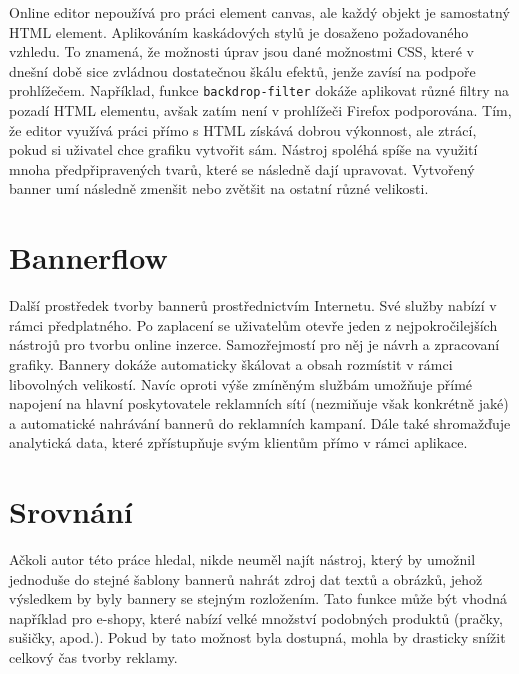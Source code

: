 Online editor nepoužívá pro práci element canvas, ale každý objekt je samostatný HTML element. Aplikováním kaskádových stylů je dosaženo požadovaného vzhledu.
To znamená, že možnosti úprav jsou dané možnostmi CSS, které v dnešní době sice zvládnou dostatečnou škálu efektů, jenže zavísí na podpoře prohlížečem.
Například, funkce \texttt{backdrop-filter} dokáže aplikovat různé filtry na pozadí HTML elementu, avšak zatím není v prohlížeči Firefox podporována.
Tím, že editor využívá práci přímo s HTML získává dobrou výkonnost, ale ztrácí, pokud si uživatel chce grafiku vytvořit sám.
Nástroj spoléhá spíše na využití mnoha předpřipravených tvarů, které se následně dají upravovat. Vytvořený banner umí následně zmenšit nebo
zvětšit na ostatní různé velikosti.

\section{Bannerflow}
Další prostředek tvorby bannerů prostřednictvím Internetu. Své služby nabízí v rámci předplatného.
Po zaplacení se uživatelům otevře jeden z nejpokročilejších nástrojů pro tvorbu online inzerce.
Samozřejmostí pro něj je návrh a zpracovaní grafiky. Bannery dokáže automaticky škálovat a obsah rozmístit v rámci libovolných velikostí.
Navíc oproti výše zmíněným službám umožňuje přímé napojení na hlavní poskytovatele reklamních sítí (nezmiňuje však konkrétně jaké) a
automatické nahrávání bannerů do reklamních kampaní. Dále také shromažďuje analytická data, které zpřístupňuje svým klientům přímo v rámci aplikace.

\section{Srovnání}
Ačkoli autor této práce hledal, nikde neuměl najít nástroj, který by umožnil jednoduše do stejné šablony bannerů nahrát zdroj dat textů a obrázků,
jehož výsledkem by byly bannery se stejným rozložením. Tato funkce může být vhodná například pro e-shopy,
které nabízí velké množství podobných produktů (pračky, sušičky, apod.). Pokud by tato možnost byla dostupná,
mohla by drasticky snížit celkový čas tvorby reklamy. 



\endinput